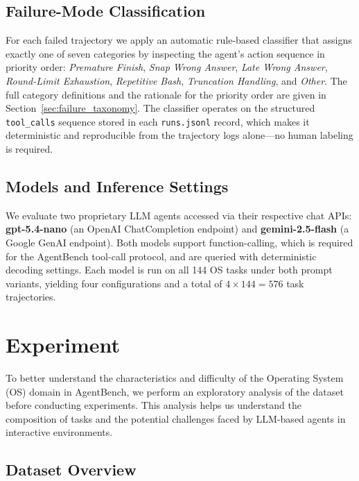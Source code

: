 \documentclass[11pt]{article}
\begin{document}
\subsection{Failure-Mode Classification}
\label{sec:method_taxonomy}

For each failed trajectory we apply an automatic rule-based classifier
that assigns exactly one of seven categories by inspecting the agent's
action sequence in priority order: \emph{Premature Finish},
\emph{Snap Wrong Answer}, \emph{Late Wrong Answer},
\emph{Round-Limit Exhaustion}, \emph{Repetitive Bash},
\emph{Truncation Handling}, and \emph{Other}. The full category
definitions and the rationale for the priority order are given in
Section~\ref{sec:failure_taxonomy}. The classifier operates on the
structured \texttt{tool\_calls} sequence stored in each
\texttt{runs.jsonl} record, which makes it deterministic and
reproducible from the trajectory logs alone---no human labeling is
required.

\subsection{Models and Inference Settings}

We evaluate two proprietary LLM agents accessed via their respective
chat APIs: \textbf{gpt-5.4-nano} (an OpenAI ChatCompletion endpoint) and
\textbf{gemini-2.5-flash} (a Google GenAI endpoint). Both models support
function-calling, which is required for the AgentBench tool-call
protocol, and are queried with deterministic decoding settings. Each
model is run on all 144 OS tasks under both prompt variants, yielding
four configurations and a total of $4 \times 144 = 576$ task
trajectories.


\section{Experiment}
\label{sec:experiment}

To better understand the characteristics and difficulty of the Operating System (OS) domain in AgentBench, we perform an exploratory analysis of the dataset before conducting experiments. This analysis helps us understand the composition of tasks and the potential challenges faced by LLM-based agents in interactive environments.

\subsection{Dataset Overview}
\end{document}
